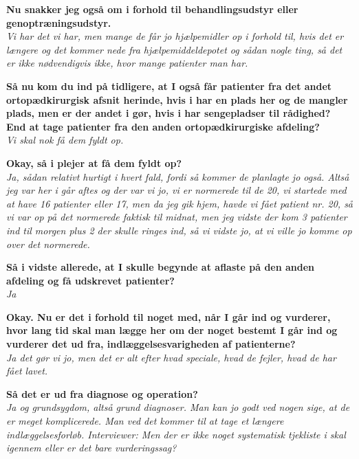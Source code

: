 \textbf{ Nu snakker jeg også om i forhold til behandlingsudstyr eller genoptræningsudstyr.} \\
\noindent
\textit{Vi har det vi har, men mange de får jo hjælpemidler op i forhold til, hvis det er længere og det kommer nede fra hjælpemiddeldepotet og sådan nogle ting, så det er ikke nødvendigvis ikke, hvor mange patienter man har. } \\
\noindent

\textbf{Så nu kom du ind på tidligere, at I også får patienter fra det andet ortopædkirurgisk afsnit herinde, hvis i har en plads her og de mangler plads, men er der andet i gør, hvis i har sengepladser til rådighed? End at tage patienter fra den anden ortopædkirurgiske afdeling? } \\
\noindent
\textit{Vi skal nok få dem fyldt op. } \\
\noindent

\textbf{Okay, så i plejer at få dem fyldt op? } \\
\noindent
\textit{Ja, sådan relativt hurtigt i hvert fald, fordi så kommer de planlagte jo også. Altså jeg var her i går aftes og der var vi jo, vi er normerede til de 20, vi startede med at have 16 patienter eller 17, men da jeg gik hjem, havde vi fået patient nr. 20, så vi var op på det normerede faktisk til midnat, men jeg vidste der kom 3 patienter ind til morgen plus 2 der skulle ringes ind, så vi vidste jo, at vi ville jo komme op over det normerede.} \\
\noindent

\textbf{Så i vidste allerede, at I skulle begynde at aflaste på den anden afdeling og få udskrevet patienter?} \\
\noindent
\textit{Ja} \\
\noindent

\textbf{Okay. Nu er det i forhold til noget med, når I går ind og vurderer, hvor lang tid skal man lægge her om der noget bestemt I går ind og vurderer det ud fra, indlæggelsesvarigheden af patienterne?} \\
\noindent
\textit{ Ja det gør vi jo, men det er alt efter hvad speciale, hvad de fejler, hvad de har fået lavet.}  \\
\noindent


\textbf{Så det er ud fra diagnose og operation?} \\
\noindent
\textit{Ja og grundsygdom, altså grund diagnoser. Man kan jo godt ved nogen sige, at de er meget komplicerede. Man ved det kommer til at tage et længere indlæggelsesforløb.
Interviewer: Men der er ikke noget systematisk tjekliste i skal igennem eller er det bare vurderingssag?} \\
\noindent

